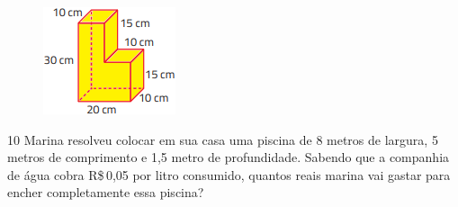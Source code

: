 \begin{minipage}{.5\textwidth}
\begin{figure}[H]
\centering\includegraphics[width=\textwidth]{./imgSAEB_8_MAT/media/image53.png}
\end{figure}
\end{minipage}
\begin{minipage}{.5\textwidth}





\end{minipage}

\vspace{1cm}

\num{10} Marina resolveu colocar em sua casa uma piscina de 8 metros de
largura, 5 metros de comprimento e 1,5 metro de profundidade. Sabendo
que a companhia de água cobra R\$\,0,05 por litro consumido, quantos
reais marina vai gastar para encher completamente essa piscina?




\vspace{3cm}

